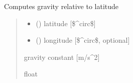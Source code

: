\documentclass[letterpaper,10pt,english]{sphinxmanual}
\begin{document}
\begin{fulllineitems}
\label{\detokenize{users_guide:AirSeaFluxCode.util_subs.gc}}
\pysigstartsignatures
{}
\pysigstopsignatures
\sphinxAtStartPar
Computes gravity relative to latitude
\begin{quote}\begin{description}
\begin{itemize}
\item {} 
\sphinxAtStartPar
{} () \textendash{} latitude {[}\$\textasciicircum{}circ\${]}

\item {} 
\sphinxAtStartPar
{} () \textendash{} longitude {[}\$\textasciicircum{}circ\$, optional{]}

\end{itemize}

\sphinxAtStartPar
{} \textendash{} gravity constant {[}m/s\textasciicircum{}2{]}

\sphinxAtStartPar
float

\end{description}\end{quote}

\end{fulllineitems}

\end{document}
